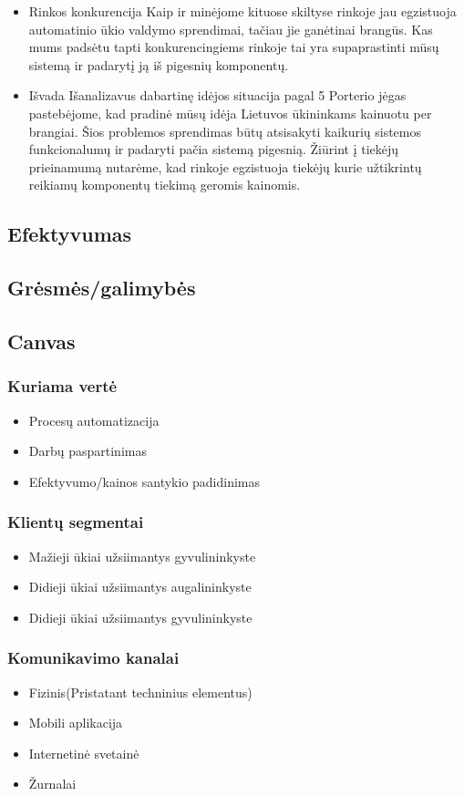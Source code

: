\documentclass[oneside]{VUMIFPSkursinis}
\begin{document}
\begin{itemize}
		\item{Rinkos konkurencija}
Kaip ir minėjome kituose skiltyse rinkoje jau egzistuoja automatinio ūkio valdymo sprendimai, tačiau jie ganėtinai brangūs. Kas mums padsėtu tapti konkurencingiems rinkoje tai yra supaprastinti mūsų sistemą ir padarytį ją iš pigesnių komponentų.
		\item{Išvada} Išanalizavus dabartinę idėjos situacija pagal 5 Porterio jėgas pastebėjome, kad pradinė mūsų idėja Lietuvos ūkininkams kainuotu per brangiai. Šios problemos sprendimas būtų atsisakyti kaikurių sistemos funkcionalumų ir padaryti pačia sistemą pigesnią. Žiūrint į tiekėjų prieinamumą nutarėme, kad  rinkoje egzistuoja tiekėjų kurie užtikrintų reikiamų komponentų tiekimą geromis kainomis.

	\end{itemize}

	\subsection{Efektyvumas}
	\subsection{Grėsmės/galimybės}
	\subsection{Canvas}
	\subsubsection{Kuriama vertė}
	\begin{itemize}
		\item Procesų automatizacija
		\item Darbų paspartinimas
		\item Efektyvumo/kainos santykio padidinimas
	\end{itemize}
	\subsubsection{Klientų segmentai}
	\begin{itemize}
	\item Mažieji ūkiai užsiimantys gyvulininkyste
	\item Didieji ūkiai užsiimantys augalininkyste
	\item Didieji ūkiai užsiimantys gyvulininkyste
	\end{itemize}
	\subsubsection{Komunikavimo kanalai}
	\begin{itemize}
	\item Fizinis(Pristatant techninius elementus)
	\item Mobili aplikacija
	\item Internetinė svetainė
	\item Žurnalai
	\end{itemize}
\end{document}
